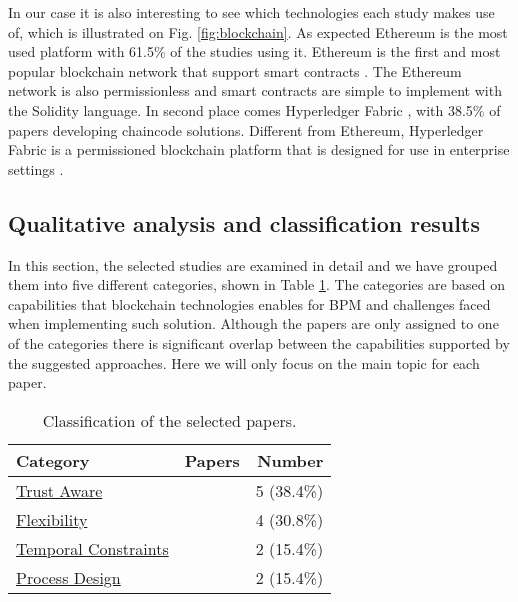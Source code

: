 In our case it is also interesting to see which technologies each study makes use of, which is illustrated on Fig. \ref{fig:blockchain}. As expected Ethereum is the most used platform with 61.5\% of the studies using it. Ethereum is the first and most popular blockchain network that support smart contracts \cite{eth}. The Ethereum network is also permissionless and smart contracts are simple to implement with the Solidity language. In second place comes Hyperledger Fabric \cite{hyperledge}, with 38.5\% of papers developing chaincode solutions. Different from Ethereum, Hyperledger Fabric is a permissioned blockchain platform that is designed for use in enterprise settings \cite{hyperledge}. 

\subsection{Qualitative analysis and classification results}
In this section, the selected studies are examined in detail and we have grouped them into five different categories, shown in Table \ref{tab:classification}. The categories are based on capabilities that blockchain technologies enables for BPM and challenges faced when implementing such solution. Although the papers are only assigned to one of the categories there is significant overlap between the capabilities supported by the suggested approaches. Here we will only focus on the main topic for each paper.


\setlength{\tabcolsep}{3em}
\begin{table}
    \centering
    \caption{Classification of the selected papers.}
    \begin{tabular}{l c r}
        \hline
        Category & Papers & Number \\
        \hline\hline
        \hyperref[sssec:trust]{Trust Aware} & \cite{alves_exploring_2022, corradini_engineering_2022, fang_workflow_2020, nagano_blockchain_2020, akhtar_blockchain_2020} & 5 (38.4\%)\\
        \hyperref[sssec:flex]{Flexibility} & \cite{corradini_flexible_2022, lopez-pintado_controlled_2022, klinger-upgrade, loukil_decentralized_2021} & 4 (30.8\%)\\
        \hyperref[sssec:temp]{Temporal Constraints} & \cite{abid_modelling_2020, tonga_naha_pupa_2022} & 2 (15.4\%)\\
        \hyperref[sssec:design]{Process Design} & \cite{milani_business_2020, schinle_integration_2020} & 2 (15.4\%)\\
        \hline
    \end{tabular}
    \label{tab:classification}
\end{table}

